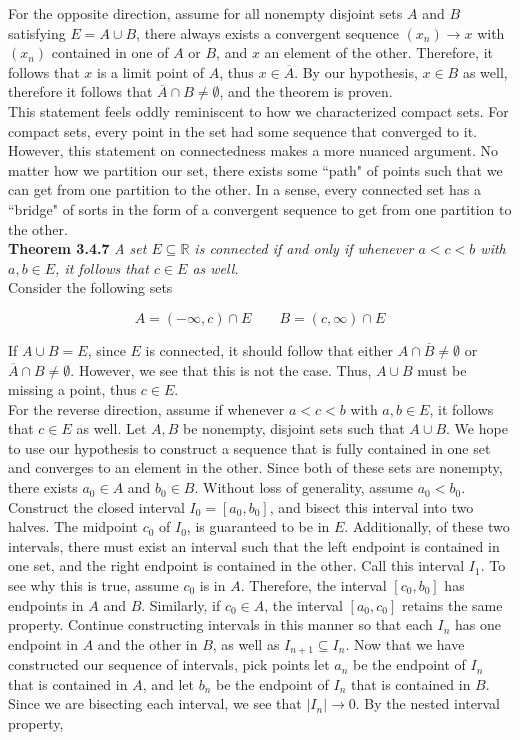 \documentclass[12pt, letterpaper, twoside]{article}
\begin{document}
For the opposite direction, assume for all nonempty disjoint sets $A$ and $B$ satisfying $E = A \cup B$, there always exists a convergent sequence $(x_n) \to x$ with $(x_n)$ contained in one of $A$ or $B$, and $x$ an element of the other. Therefore, it follows that $x$ is a limit point of $A$, thus $x \in \overline{A}$. By our hypothesis, $x \in B$ as well, therefore it follows that $\overline{A} \cap B \neq \emptyset$, and the theorem is proven. \\

This statement feels oddly reminiscent to how we characterized compact sets. For compact sets, every point in the set had some sequence that converged to it. However, this statement on connectedness makes a more nuanced argument. No matter how we partition our set, there exists some ``path" of points such that we can get from one partition to the other. In a sense, every connected set has a ``bridge" of sorts in the form of a convergent sequence to get from one partition to the other. \\

\textbf{ Theorem 3.4.7} \textit{ A set $E \subseteq \mathbb{R}$ is connected if and only if whenever $a < c < b$
with $a, b \in E$, it follows that $c \in E$ as well.} \\

Consider the following sets 

$$
A = (-\infty, c) \cap E \qquad B = (c, \infty) \cap E
$$

If $A \cup B = E$, since $E$ is connected, it should follow that either $A \cap \overline{B} \neq \emptyset$ or $\overline{A} \cap B \neq \emptyset$. However, we see that this is not the case. Thus, $A \cup B$ must be missing a point, thus $c \in E$. \\

For the reverse direction, assume if whenever $a < c < b$ with $a, b \in E$, it follows that $c \in E$ as well. Let $A, B$ be nonempty, disjoint sets such that $A \cup B$. We hope to use our hypothesis to construct a sequence that is fully contained in one set and converges to an element in the other. Since both of these sets are nonempty, there exists $a_0 \in A$ and $b_0 \in B$. Without loss of generality, assume $a_0 < b_0$. Construct the closed interval $I_0 = [a_0, b_0]$, and bisect this interval into two halves. The midpoint $c_0$ of $I_0$, is guaranteed to be in $E$. Additionally, of these two intervals, there must exist an interval such that the left endpoint is contained in one set, and the right endpoint is contained in the other. Call this interval $I_1$. To see why this is true, assume $c_0$ is in $A$. Therefore, the interval $[c_0, b_0]$ has endpoints in $A$ and $B$. Similarly, if $c_0 \in A$, the interval $[a_0, c_0]$ retains the same property. Continue constructing intervals in this manner so that each $I_n$ has one endpoint in $A$ and the other in $B$, as well as $I_{n+1} \subseteq I_n$. Now that we have constructed our sequence of intervals, pick points let $a_n$ be the endpoint of $I_n$ that is contained in $A$, and let $b_n$ be the endpoint of $I_n$ that is contained in $B$. Since we are bisecting each interval, we see that $|I_n| \to 0$. By the nested interval property, 
\end{document}

